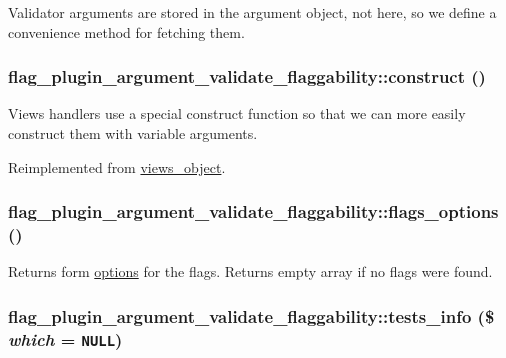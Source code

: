 Validator arguments are stored in the argument object, not here, so we define a convenience method for fetching them. \hypertarget{classflag__plugin__argument__validate__flaggability_6eb16f6ded91625eb61ea1af4ac22e9d}{
\subsubsection[{construct}]{\setlength{\rightskip}{0pt plus 5cm}flag\_\-plugin\_\-argument\_\-validate\_\-flaggability::construct ()}}
\label{classflag__plugin__argument__validate__flaggability_6eb16f6ded91625eb61ea1af4ac22e9d}


Views handlers use a special construct function so that we can more easily construct them with variable arguments. 

Reimplemented from \hyperlink{classviews__object_6583d6be7e59dd1e39056e320ea2c2d4}{views\_\-object}.\hypertarget{classflag__plugin__argument__validate__flaggability_4c3bce43163725971479413be31a1c0c}{
\subsubsection[{flags\_\-options}]{\setlength{\rightskip}{0pt plus 5cm}flag\_\-plugin\_\-argument\_\-validate\_\-flaggability::flags\_\-options ()}}
\label{classflag__plugin__argument__validate__flaggability_4c3bce43163725971479413be31a1c0c}


Returns form \hyperlink{classviews__object_894c01006e88dee15ef867272d22b3ee}{options} for the flags. Returns empty array if no flags were found. \hypertarget{classflag__plugin__argument__validate__flaggability_2ec92ee4546bfb70b7d81b183a6236c5}{
\subsubsection[{tests\_\-info}]{\setlength{\rightskip}{0pt plus 5cm}flag\_\-plugin\_\-argument\_\-validate\_\-flaggability::tests\_\-info (\$ {\em which} = {\tt NULL})}}
\label{classflag__plugin__argument__validate__flaggability_2ec92ee4546bfb70b7d81b183a6236c5}


